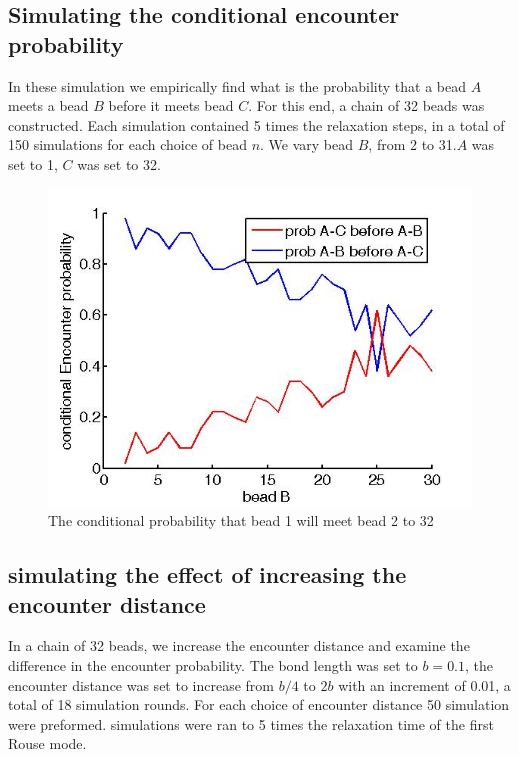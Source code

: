 \documentclass[12pt]{book}
\begin{document}
\subsection{Simulating the conditional encounter probability}
In these simulation we empirically find what is the probability that a bead $A$ meets a bead $B$ before it meets bead $C$. For this end, a chain of 32 beads was constructed. Each simulation contained 5 times the relaxation steps, in a total of 150 simulations for each choice of bead $n$. We vary bead $B$, from 2 to 31.$A$ was set to 1, $C$ was set to 32.

\begin{figure}[H]
\includegraphics[scale=0.3]{conditionalEncounterProb32BeadsVaryBead2From2To31}
\caption{\scriptsize{The conditional probability that bead 1 will meet bead 2 to 32}}
\label{conditionalEncounterProb32BeadsVaryBead2From2To31}
\end{figure}

\subsection{simulating the effect of increasing the encounter distance}
In a chain of 32 beads, we increase the encounter distance and examine the difference in the encounter probability. 
The bond length was set to $b=0.1$, the encounter distance was set to increase from $b/4$ to $2b$ with an increment of 0.01, a total of 18 simulation rounds. For each choice of encounter distance 50 simulation were preformed. simulations were ran to 5 times the relaxation time of the first Rouse mode. 
\end{document}
